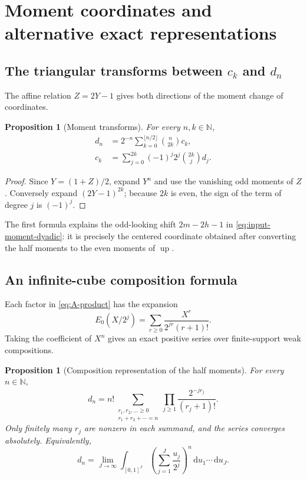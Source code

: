 \documentclass[11pt,oneside]{article}
\newtheorem{proposition}[theorem]{Proposition}
\theoremstyle{definition}
\theoremstyle{remark}
\newcommand{\N}{\mathbb N}
\newcommand{\Up}{\operatorname{up}}
\newcommand{\dd}{\,\mathrm d}
\begin{document}
\section{Moment coordinates and alternative exact representations}
\label{sec:moment-alternatives}

\subsection[The triangular transforms between the c and d sequences]{The triangular transforms between $c_k$ and $d_n$}

The affine relation $Z=2Y-1$ gives both directions of the moment change of coordinates.

\begin{proposition}[Moment transforms]
\label{prop:moment-transforms}
For every $n,k\in\N$,
\begin{align}
 d_n
 &=2^{-n}\sum_{k=0}^{\lfloor n/2\rfloor}\binom n{2k}c_k,
                                                               \label{eq:d-from-c-new}\\
 c_k
 &=\sum_{j=0}^{2k}(-1)^j2^j\binom{2k}{j}d_j.              \label{eq:c-from-d-new}
\end{align}
\end{proposition}

\begin{proof}
Since $Y=(1+Z)/2$, expand $Y^n$ and use the vanishing odd moments of $Z$.  Conversely expand
$(2Y-1)^{2k}$; because $2k$ is even, the sign of the term of degree $j$ is $(-1)^j$.
\end{proof}

The first formula explains the odd-looking shift $2m-2h-1$ in
\eqref{eq:input-moment-dyadic}: it is precisely the centered coordinate obtained after
converting the half moments to the even moments of $\Up$.

\subsection{An infinite-cube composition formula}

Each factor in \eqref{eq:A-product} has the expansion
\[
 E_0(X/2^j)=\sum_{r\ge0}\frac{X^r}{2^{jr}(r+1)!}.
\]
Taking the coefficient of $X^n$ gives an exact positive series over finite-support weak
compositions.

\begin{proposition}[Composition representation of the half moments]
\label{prop:composition-d}
For every $n\in\N$,
\begin{equation}
 d_n=n!\!
 \sum_{\substack{r_1,r_2,\ldots\ge0\\r_1+r_2+\cdots=n}}
 \prod_{j\ge1}\frac{2^{-jr_j}}{(r_j+1)!}.                 \label{eq:composition-d}
\end{equation}
Only finitely many $r_j$ are nonzero in each summand, and the series converges absolutely.
Equivalently,
\begin{equation}
 d_n=\lim_{J\to\infty}\int_{[0,1]^J}
       \left(\sum_{j=1}^{J}\frac{u_j}{2^j}\right)^n
       \dd u_1\cdots\dd u_J.                              \label{eq:cube-d}
\end{equation}
\end{proposition}
\end{document}

